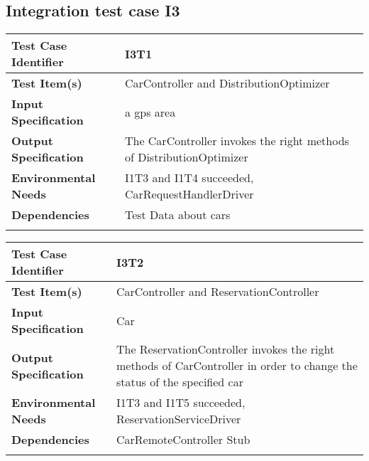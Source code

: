 \subsection{Integration test case I3}
\begin{center}
\begin{tabular*}
{\textwidth}
{l p{10.5cm}}

\hline
\textbf{Test Case Identifier} & I3T1 \\
\hline
\textbf{Test Item(s)} &  CarController and DistributionOptimizer  \\
\hline
\textbf{Input Specification} & a gps area\\
\hline
\textbf{Output Specification} & The CarController invokes the right methods of DistributionOptimizer\\
\hline
\textbf{Environmental Needs} & I1T3 and I1T4 succeeded, CarRequestHandlerDriver\\
\hline
\textbf{Dependencies} &  Test Data about cars\\
\hline
\newline
\newline
\end{tabular*}
\end{center}




\begin{center}
\begin{tabular*}
{\textwidth}
{l p{10.5cm}}

\hline
\textbf{Test Case Identifier} & I3T2 \\
\hline
\textbf{Test Item(s)} &  CarController and ReservationController  \\
\hline
\textbf{Input Specification} & Car\\
\hline
\textbf{Output Specification} & The ReservationController invokes the right methods of CarController in order to change the status of the specified car\\
\hline
\textbf{Environmental Needs} & I1T3 and I1T5 succeeded, ReservationServiceDriver\\
\hline
\textbf{Dependencies} &  CarRemoteController Stub\\
\hline
\newline
\newline
\end{tabular*}
\end{center}





